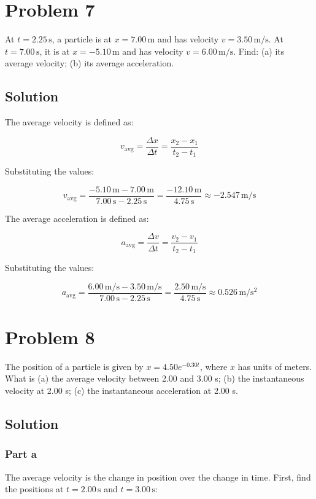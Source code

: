 \documentclass{article}
\newcommand{\meter}{\text{m}}
\newcommand{\second}{\text{s}}
\begin{document}
\section*{Problem 7}
At \( t = 2.25 \, \si{\second} \), a particle is at \( x = 7.00 \, \si{\meter} \) and has velocity \( v = 3.50 \, \si{\meter\per\second} \). At \( t = 7.00 \, \si{\second} \), it is at \( x = -5.10 \, \si{\meter} \) and has velocity \( v = 6.00 \, \si{\meter\per\second} \). Find: (a) its average velocity; (b) its average acceleration.

\subsection*{Solution}
The average velocity is defined as:

\[
v_{\text{avg}} = \frac{\Delta x}{\Delta t} = \frac{x_2 - x_1}{t_2 - t_1}
\]

Substituting the values:

\[
v_{\text{avg}} = \frac{-5.10 \, \si{\meter} - 7.00 \, \si{\meter}}{7.00 \, \si{\second} - 2.25 \, \si{\second}} = \frac{-12.10 \, \si{\meter}}{4.75 \, \si{\second}} \approx -2.547 \, \si{\meter\per\second}
\]

The average acceleration is defined as:

\[
a_{\text{avg}} = \frac{\Delta v}{\Delta t} = \frac{v_2 - v_1}{t_2 - t_1}
\]

Substituting the values:

\[
a_{\text{avg}} = \frac{6.00 \, \si{\meter\per\second} - 3.50 \, \si{\meter\per\second}}{7.00 \, \si{\second} - 2.25 \, \si{\second}} = \frac{2.50 \, \si{\meter\per\second}}{4.75 \, \si{\second}} \approx 0.526 \, \si{\meter\per\second^2}
\]

\section*{Problem 8}
The position of a particle is given by \( x = 4.50e^{-0.30t} \), where \( x \) has units of meters. What is (a) the average velocity between 2.00 and 3.00 s; (b) the instantaneous velocity at 2.00 s; (c) the instantaneous acceleration at 2.00 s.

\subsection*{Solution}
\subsubsection*{Part a}
The average velocity is the change in position over the change in time. First, find the positions at \( t = 2.00 \, \si{\second} \) and \( t = 3.00 \, \si{\second} \):
\end{document}
